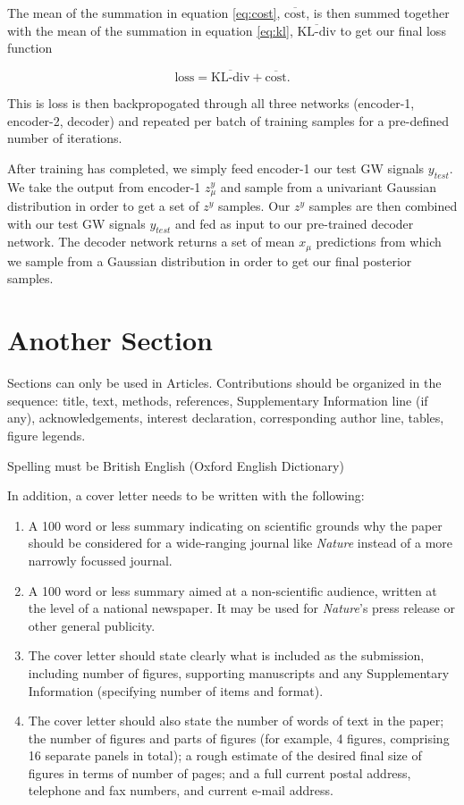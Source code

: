 \documentclass{nature}
\begin{document}
The mean of the summation in equation \ref{eq:cost}, $\overline{\textrm{cost}}$, 
is then summed together with the mean of the summation in equation \ref{eq:kl}, 
$\overline{\textrm{KL-div}}$ to 
get our final loss function

\begin{equation}
    \textrm{loss} = \overline{\textrm{KL-div}} + \overline{\textrm{cost}}.
\end{equation}

This is loss is then backpropogated through all three networks 
(encoder-1, encoder-2, decoder) and repeated per batch of 
training samples for a pre-defined number of iterations.

%
%
After training has completed, we simply feed encoder-1 our test 
GW signals $y_{test}$. We take the output from encoder-1 $z^{y}_{\mu}$ 
and sample from a univariant Gaussian distribution in order to get 
a set of $z^{y}$ samples. Our $z^{y}$ samples are then combined with our 
test GW signals $y_{test}$ and fed as input to our pre-trained decoder 
network. The decoder network returns a set of mean $x_{\mu}$ predictions 
from which we sample from a Gaussian distribution in order to get 
our final posterior samples.

%
%

%
%

\section*{Another Section}

Sections can only be used in Articles.  Contributions should be
organized in the sequence: title, text, methods, references,
Supplementary Information line (if any), acknowledgements,
interest declaration, corresponding author line, tables, figure
legends.

Spelling must be British English (Oxford English Dictionary)

In addition, a cover letter needs to be written with the
following:
\begin{enumerate}
 \item A 100 word or less summary indicating on scientific grounds
why the paper should be considered for a wide-ranging journal like
\textsl{Nature} instead of a more narrowly focussed journal.
 \item A 100 word or less summary aimed at a non-scientific audience,
written at the level of a national newspaper.  It may be used for
\textsl{Nature}'s press release or other general publicity.
 \item The cover letter should state clearly what is included as the
submission, including number of figures, supporting manuscripts
and any Supplementary Information (specifying number of items and
format).
 \item The cover letter should also state the number of
words of text in the paper; the number of figures and parts of
figures (for example, 4 figures, comprising 16 separate panels in
total); a rough estimate of the desired final size of figures in
terms of number of pages; and a full current postal address,
telephone and fax numbers, and current e-mail address.
\end{enumerate}
\end{document}
